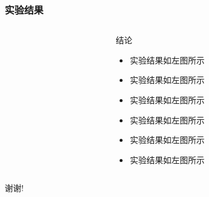 ﻿\documentclass[12pt]{ctexbeamer}	%
\begin{document}
\begin{frame}
\frametitle{实验结果}
\begin{columns}
\begin{column}{0.50\textwidth}
\end{column}
\begin{column}{0.50\textwidth}
\begin{block}{结论}
\begin{itemize}
\item 实验结果如左图所示
\item 实验结果如左图所示
\item 实验结果如左图所示
\item 实验结果如左图所示
\item 实验结果如左图所示
\item 实验结果如左图所示
\end{itemize}
\end{block}
\end{column}
\end{columns}
\end{frame}




\begin{frame}
\centerline{\Large 谢谢!}
\end{frame}
\end{document}
